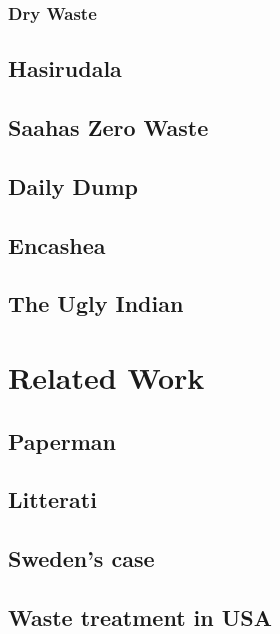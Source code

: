 \documentclass[10pt]{article}
\begin{document}
\subsubsection{Dry Waste}

\subsection{Hasirudala}

\subsection{Saahas Zero Waste}

\subsection{Daily Dump}

\subsection{Encashea}

\subsection{The Ugly Indian}

\section{Related Work}

\subsection {Paperman}

\subsection{Litterati}

\subsection{Sweden's case}

\subsection{Waste treatment in USA}





\end{document}
